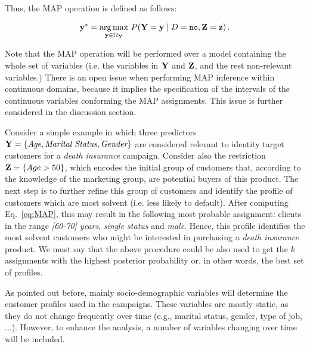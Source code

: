 Thus, the MAP operation is defined as follows:

\begin{equation}
\mathbf{y}^{*} = \underset{\mathbf{y}\in\Omega_{\mathbf{Y}}} {\mathrm{arg\,max}} ~ P(\mathbf{Y}=\mathbf{y}\mid D = \texttt{no}, \mathbf{Z}=\mathbf{z})\, .
\label{eq:MAP}
\end{equation}

Note that the MAP operation will be performed over a model containing the whole set of variables (i.e. the variables in $\mathbf{Y}$ and $\mathbf{Z}$, and the rest non-relevant variables.) There is an open issue when performing MAP inference within continuous domains, because it implies the specification of the intervals of the continuous variables conforming the MAP assignments. This issue is further considered in the discussion section. 

Consider a simple example in which three predictors $\mathbf{Y} = \{ \emph{Age}, \emph{Marital Status}, \emph{Gender}\}$ are considered relevant to identity target customers for a \textit{death insurance} campaign. Consider also the restriction $\mathbf{Z} = \{Age>50\}$, which encodes the initial group of customers that, according to the knowledge of the marketing group, are potential buyers of this product.  The next step is to further refine this group of customers and identify the profile of customers which are most solvent (i.e. less likely to default). After computing Eq.~\ref{eq:MAP}, this may result in the following most probable assignment: clients in the range \emph {[60-70] years}, \emph{single status} and \emph{male}. Hence, this profile identifies the most solvent customers who might be interested in purchasing a \emph{death insurance} product. We must say that the above  procedure could be also used to get the $k$ assignments with the highest posterior probability or, in other words, the best set of profiles.   



As pointed out before, mainly socio-demographic variables will determine the customer profiles used in the campaigns. These variables are mostly static, as they do not change frequently over time (e.g., marital status, gender, type of job, ...). However, to enhance the analysis, a number of  variables changing over time will be included. 

